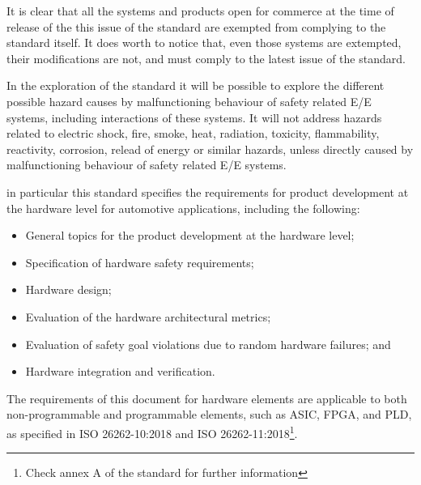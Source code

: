\documentclass[./dissertation.tex]{subfiles}
\begin{document}
It is clear that all the systems and products open for commerce at the time of release of the this issue of the standard are exempted from complying to the standard itself. It does worth to notice that, even those systems are extempted, their modifications are not, and must comply to the latest issue of the standard.

In the exploration of the standard it will be possible to explore the different possible hazard causes by malfunctioning behaviour of safety related E/E systems, including interactions of these systems. It will not address hazards related to electric shock, fire, smoke, heat, radiation, toxicity, flammability, reactivity, corrosion, relead of energy or similar hazards, unless directly caused by malfunctioning behaviour of safety related E/E systems.

in particular this standard specifies the requirements for product development at the hardware level for automotive applications, including the following:
\begin{itemize}
\item General topics for the product development at the hardware level;
\item Specification of hardware safety requirements;
\item Hardware design;
\item Evaluation of the hardware architectural metrics;
\item Evaluation of safety goal violations due to random hardware failures; and
\item Hardware integration and verification.
\end{itemize}
The requirements of this document for hardware elements are applicable to both non-programmable and programmable elements, such as ASIC, FPGA, and PLD, as specified in ISO 26262-10:2018 and ISO 26262-11:2018\footnote{Check annex A of the standard for further information}.
\end{document}
